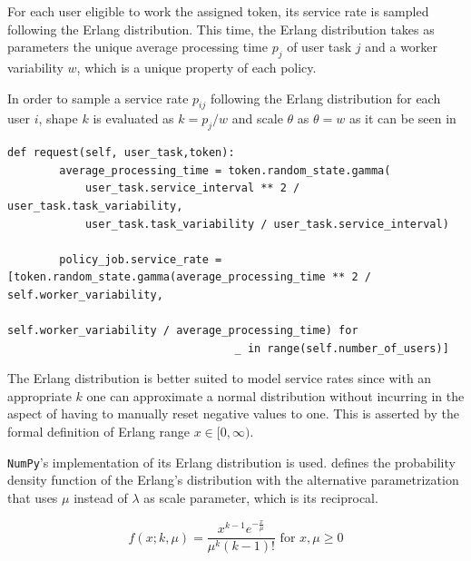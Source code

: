 For each user eligible to work the assigned token, its service rate is sampled following the Erlang distribution. This time, the Erlang distribution takes as parameters the unique average processing time $p_j$ of user task $j$ and a worker variability $w$, which is a unique property of each policy.

In order to sample a service rate $p_{ij}$ following the Erlang distribution for each user $i$, shape $k$ is evaluated as $k=p_j/w$ and scale $\theta$ as $\theta = w$ as it can be seen in 

\begin{lstlisting}[caption=User service rate sampling following an Erlang distribution,label=lst:user_service_rate,style=CustomPython]
    def request(self, user_task,token):
        average_processing_time = token.random_state.gamma(
            user_task.service_interval ** 2 / user_task.task_variability,
            user_task.task_variability / user_task.service_interval)

        policy_job.service_rate = [token.random_state.gamma(average_processing_time ** 2 / self.worker_variability,
                                                           self.worker_variability / average_processing_time) for
                                   _ in range(self.number_of_users)]
\end{lstlisting}

The Erlang distribution is better suited to model service rates since with an appropriate $k$ one can approximate a normal distribution without incurring in the aspect of having to manually reset negative values to one. This is asserted by the formal definition of Erlang range $x \in [0,\infty)$.

\texttt{NumPy}'s implementation of its Erlang distribution is used.  defines the probability density function of the Erlang's distribution with the alternative parametrization that uses $\mu$ instead of $\lambda$ as scale parameter, which is its reciprocal.

\begin{equation}
\label{eq:erlang_density}
	f(x;k,\mu) = \frac{x^{k-1} e^{-\frac{x}{\mu}}}{\mu^k (k-1)!} \text{ for } x,\mu \geq 0
\end{equation}